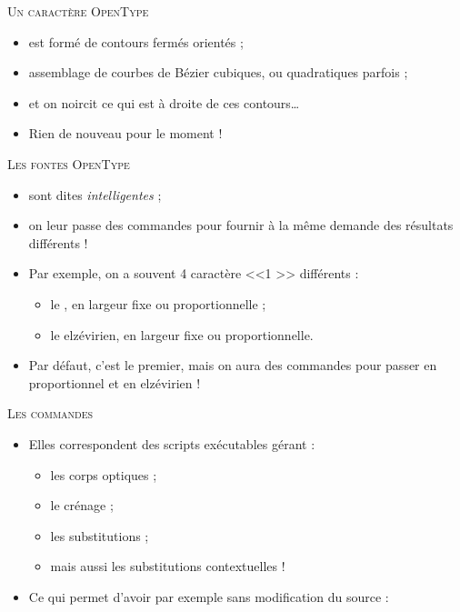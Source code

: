 \documentclass[12pt,a4paper,twocolumn]{book} %
\def\ogla{{\fontfamily{fi4}\selectfont<<}}
\def\fgla{{\fontfamily{fi4}\selectfont>>}}
\begin{document}
{	                                  {\textsc{Un caractère OpenType}}
		                          \begin{itemize}
			                  \item est formé de contours fermés orientés ;
			                  \item assemblage de courbes de Bézier cubiques, ou quadratiques parfois ;
			                  \item et on noircit ce qui est à droite de ces contours\dots
			                  \item Rien de nouveau pour le moment !
		                          \end{itemize}




                                          {\textsc{Les fontes OpenType}}
		                          \begin{itemize}
			                  \item sont dites \textit{intelligentes} ;
			                  \item on leur passe des commandes pour fournir à la même demande des résultats différents !
			                  \item Par exemple, on a souvent 4 caractère \ogla 1 \fgla{} différents :
			                    \begin{itemize}
				            \item le {}, en largeur fixe ou proportionnelle ;
				            \item le {\selectfont {}} elzévirien, en largeur fixe ou proportionnelle.
			                    \end{itemize}
			                  \item Par défaut, c'est le premier, mais on aura des commandes pour passer en proportionnel et en elzévirien !
		                          \end{itemize}




		                          {\textsc{Les commandes}}
			                  \begin{itemize}
				          \item  Elles correspondent des scripts exécutables gérant :
				            \begin{itemize}
					    \item les corps optiques ;
					    \item le crénage ;
					    \item les substitutions ;
					    \item mais aussi les substitutions contextuelles !
				            \end{itemize}
				          \item  Ce qui permet d'avoir par exemple sans modification du source :



\end{itemize}}
\end{document}
